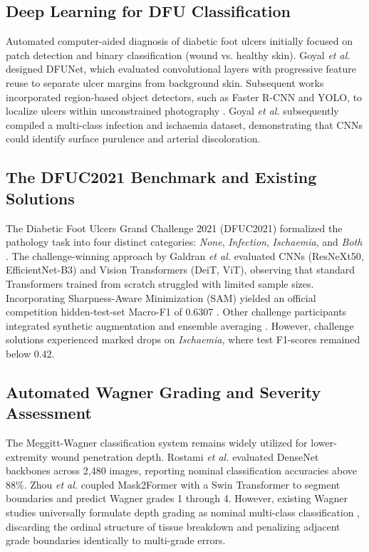 \documentclass[journal]{IEEEtran}
\begin{document}
\subsection{Deep Learning for DFU Classification}
Automated computer-aided diagnosis of diabetic foot ulcers initially focused on patch detection and binary classification (wound vs. healthy skin). Goyal \textit{et al.} \cite{goyal2020dfunet} designed DFUNet, which evaluated convolutional layers with progressive feature reuse to separate ulcer margins from background skin. Subsequent works incorporated region-based object detectors, such as Faster R-CNN and YOLO, to localize ulcers within unconstrained photography \cite{goyal2019robust}. Goyal \textit{et al.} \cite{goyal2020recognition} subsequently compiled a multi-class infection and ischaemia dataset, demonstrating that CNNs could identify surface purulence and arterial discoloration.

\subsection{The DFUC2021 Benchmark and Existing Solutions}
The Diabetic Foot Ulcers Grand Challenge 2021 (DFUC2021) formalized the pathology task into four distinct categories: \textit{None}, \textit{Infection}, \textit{Ischaemia}, and \textit{Both} \cite{cassidy2021diabetic}. The challenge-winning approach by Galdran \textit{et al.} \cite{galdran2021convolutional} evaluated CNNs (ResNeXt50, EfficientNet-B3) and Vision Transformers (DeiT, ViT), observing that standard Transformers trained from scratch struggled with limited sample sizes. Incorporating Sharpness-Aware Minimization (SAM) yielded an official competition hidden-test-set Macro-F1 of 0.6307 \cite{galdran2021convolutional}. Other challenge participants integrated synthetic augmentation and ensemble averaging \cite{cassidy2021diabetic}. However, challenge solutions experienced marked drops on \textit{Ischaemia}, where test F1-scores remained below 0.42.

\subsection{Automated Wagner Grading and Severity Assessment}
The Meggitt-Wagner classification system \cite{wagner1981dysvascular} remains widely utilized for lower-extremity wound penetration depth. Rostami \textit{et al.} \cite{rostami2024deep} evaluated DenseNet backbones across 2,480 images, reporting nominal classification accuracies above 88\%. Zhou \textit{et al.} \cite{zhou2025deep} coupled Mask2Former with a Swin Transformer to segment boundaries and predict Wagner grades 1 through 4. However, existing Wagner studies universally formulate depth grading as nominal multi-class classification \cite{rostami2024deep, zhou2025deep}, discarding the ordinal structure of tissue breakdown and penalizing adjacent grade boundaries identically to multi-grade errors.
\end{document}
